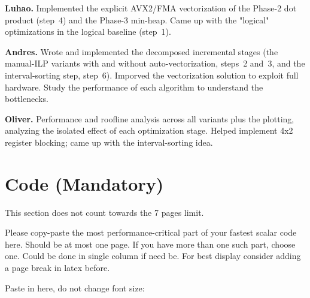 \documentclass[letterpaper]{article}
\newcommand{\mypar}[1]{{\bf #1.}}
\begin{document}
\mypar{Luhao} Implemented the explicit AVX2/FMA vectorization of the Phase-2 dot product (step~4) and the Phase-3 min-heap. Came up with the "logical" optimizations in the logical baseline (step~1).

\mypar{Andres} Wrote and implemented the decomposed incremental stages (the manual-ILP variants with and without auto-vectorization, steps~2 and~3, and the interval-sorting step, step~6). Imporved the vectorization solution to exploit full hardware. Study the performance of each algorithm to understand the bottlenecks.

\mypar{Oliver} Performance and roofline analysis across all variants plus the plotting, analyzing the isolated effect of each optimization stage. Helped implement 4x2 register blocking; came up with the interval-sorting idea.


\section{Code (Mandatory)}\label{sec:code}
This section does not count towards the 7 pages limit.

Please copy-paste the most performance-critical part of your fastest scalar code here. Should be at most one page. If you have more than one such part, choose one. Could be done in single column if need be. For best display consider adding a page break in latex before.

Paste in here, do not change font size:




\end{document}
